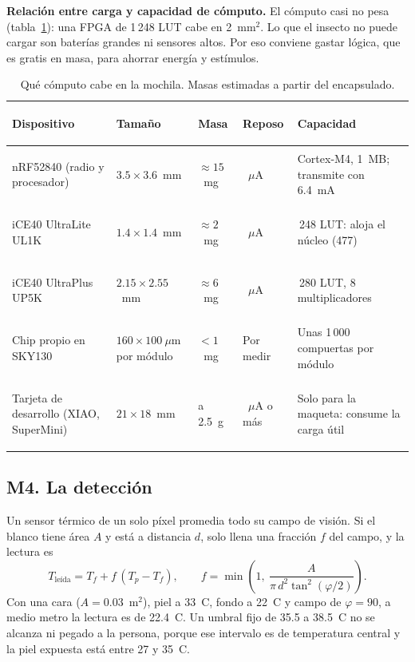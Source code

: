 \textbf{Relación entre carga y capacidad de cómputo.} El cómputo casi no pesa
(tabla~\ref{tab:computo}): una FPGA de 1\,248 LUT cabe en 2~mm$^2$. Lo que el insecto no
puede cargar son baterías grandes ni sensores altos. Por eso conviene gastar lógica, que es
gratis en masa, para ahorrar energía y estímulos.

\begin{table}[H]
\centering\footnotesize
\caption{Qué cómputo cabe en la mochila. Masas estimadas a partir del encapsulado.}
\label{tab:computo}
\begin{tabularx}{\textwidth}{@{}>{\bfseries\raggedright\arraybackslash}p{3.7cm} >{\raggedright\arraybackslash}p{2.6cm} >{\raggedright\arraybackslash}p{1.6cm} >{\raggedright\arraybackslash}p{2.2cm} >{\raggedright\arraybackslash}X@{}}
\toprule
\rowcolor{TableHead} Dispositivo & Tamaño & Masa & Reposo & Capacidad \\
\midrule
nRF52840 (radio y procesador)~\cite{nordic} & $3.5\times3.6$~mm & $\approx15$~mg & 0.4~$\mu$A & Cortex-M4, 1~MB; transmite con 6.4~mA \\
iCE40 UltraLite UL1K~\cite{lattice} & $1.4\times1.4$~mm & $\approx2$~mg & 35~$\mu$A & 1\,248 LUT: aloja el núcleo (477) \\
iCE40 UltraPlus UP5K~\cite{lattice} & $2.15\times2.55$~mm & $\approx6$~mg & 75~$\mu$A & 5\,280 LUT, 8 multiplicadores \\
Chip propio en SKY130~\cite{tinytapeout} & $160\times100~\mu$m por módulo & $<1$~mg & Por medir & Unas 1\,000 compuertas por módulo \\
Tarjeta de desarrollo (XIAO, SuperMini) & $21\times18$~mm & 1.5 a 2.5~g & 44~$\mu$A o más & Solo para la maqueta: consume la carga útil \\
\bottomrule
\end{tabularx}
\end{table}

\subsection{M4. La detección}
\label{sec:deteccion}

Un sensor térmico de un solo píxel promedia todo su campo de visión. Si el blanco tiene área
$A$ y está a distancia $d$, solo llena una fracción $f$ del campo, y la lectura es
\begin{equation}
T_{\text{leída}}=T_f+f\,(T_p-T_f),\qquad
f=\min\!\left(1,\ \frac{A}{\pi\,d^2\tan^2(\varphi/2)}\right).
\end{equation}
Con una cara ($A=0.03$~m$^2$), piel a 33~\textdegree C, fondo a 22~\textdegree C y campo de
$\varphi=90$\textdegree, a medio metro la lectura es de 22.4~\textdegree C. Un umbral fijo de
35.5 a 38.5~\textdegree C no se alcanza ni pegado a la persona, porque ese intervalo es de
temperatura central y la piel expuesta está entre 27 y 35~\textdegree C.

